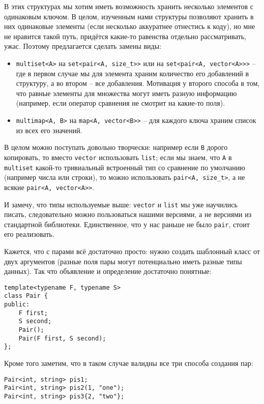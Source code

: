 В этих структурах мы хотим иметь возможность хранить несколько элементов с одинаковым ключом. В целом, изученным нами структуры позволяют хранить в них одинаковые элементы (если несколько аккуратнее отнестись к коду), но мне не нравится такой путь, придётся какие-то равенства отдельно рассматривать, ужас. Поэтому предлагается сделать замены виды:
\begin{itemize}
    \item \texttt{multiset<A>} на \texttt{set<pair<A, size_t>>} или на \texttt{set<pair<A, vector<A>>>} -- где в первом случае мы для элемента храним количество его добавлений в структуру, а во втором -- все добавления. Мотивация у второго способа в том, что равные элементы для множества могут иметь разную информацию (например, если оператор сравнения не смотрит на какие-то поля).
    \item \texttt{multimap<A, B>} на \texttt{map<A, vector<B>>} -- для каждого ключа храним список из всех его значений.
\end{itemize}

В целом можно поступать довольно творчески: например если \texttt{B} дорого копировать, то вместо \texttt{vector} использовать \texttt{list}; если мы знаем, что \texttt{A} в \texttt{multiset} какой-то тривиальный встроенный тип со сравнение по умолчанию (например числа или строки), то можно использовать \texttt{pair<A, size_t>}, а не всякие \texttt{pair<A, vector<A>>}.

И замечу, что типы используемые выше: \texttt{vector} и \texttt{list} мы уже научились писать, следовательно можно пользоваться нашими версиями, а не версиями из стандартной библиотеки. Единственное, что у нас раньше не было \texttt{pair}, стоит его реализовать.


Кажется, что с парами всё достаточно просто: нужно создать шаблонный класс от двух аргументов (разные поля пары могут потенциально иметь разные типы данных). Так что объявление и определение достаточно понятные:

\begin{verbatim}
template<typename F, typename S>
class Pair {
public:
    F first;
    S second;
    Pair();
    Pair(F first, S second);
};
\end{verbatim}

Кроме того заметим, что в таком случае валидны все три способа создания пар:
\begin{verbatim}
Pair<int, string> pis1;
Pair<int, string> pis2(1, "one");
Pair<int, string> pis3{2, "two"};
\end{verbatim}


